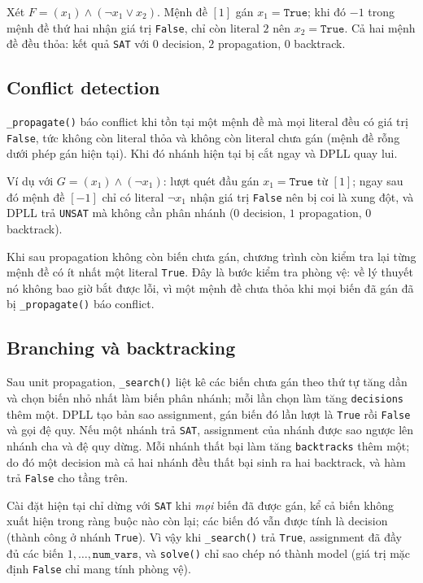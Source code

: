 Xét $F=(x_1)\land(\neg x_1\lor x_2)$. Mệnh đề $[1]$ gán $x_1=\texttt{True}$;
khi đó $-1$ trong mệnh đề thứ hai nhận giá trị \texttt{False}, chỉ còn
literal $2$ nên $x_2=\texttt{True}$. Cả hai mệnh đề đều thỏa: kết quả
\texttt{SAT} với $0$ decision, $2$ propagation, $0$ backtrack.

\subsection{Conflict detection}
\label{sec:dpll-conflict}
\texttt{\_propagate()} báo conflict khi tồn tại một mệnh đề mà mọi literal
đều có giá trị \texttt{False}, tức không còn literal thỏa và không còn
literal chưa gán (mệnh đề rỗng dưới phép gán hiện tại). Khi đó nhánh hiện tại
bị cắt ngay và DPLL quay lui.

Ví dụ với $G=(x_1)\land(\neg x_1)$: lượt quét đầu gán $x_1=\texttt{True}$ từ
$[1]$; ngay sau đó mệnh đề $[-1]$ chỉ có literal $\neg x_1$ nhận giá trị
\texttt{False} nên bị coi là xung đột, và DPLL trả \texttt{UNSAT} mà không
cần phân nhánh ($0$ decision, $1$ propagation, $0$ backtrack).

Khi sau propagation không còn biến chưa gán, chương trình còn kiểm tra lại
từng mệnh đề có ít nhất một literal \texttt{True}. Đây là bước kiểm tra phòng
vệ: về lý thuyết nó không bao giờ bắt được lỗi, vì một mệnh đề chưa thỏa khi
mọi biến đã gán đã bị \texttt{\_propagate()} báo conflict.

\subsection{Branching và backtracking}
Sau unit propagation, \texttt{\_search()} liệt kê các biến chưa gán theo thứ
tự tăng dần và chọn biến nhỏ nhất làm biến phân nhánh; mỗi lần chọn làm tăng
\texttt{decisions} thêm một. DPLL tạo bản sao assignment, gán biến đó lần lượt
là \texttt{True} rồi \texttt{False} và gọi đệ quy. Nếu một nhánh trả
\texttt{SAT}, assignment của nhánh được sao ngược lên nhánh cha và đệ quy dừng.
Mỗi nhánh thất bại làm tăng \texttt{backtracks} thêm một; do đó một decision
mà cả hai nhánh đều thất bại sinh ra hai backtrack, và hàm trả \texttt{False}
cho tầng trên.

Cài đặt hiện tại chỉ dừng với \texttt{SAT} khi \emph{mọi} biến đã được gán,
kể cả biến không xuất hiện trong ràng buộc nào còn lại; các biến đó vẫn được
tính là decision (thành công ở nhánh \texttt{True}). Vì vậy khi
\texttt{\_search()} trả \texttt{True}, assignment đã đầy đủ các biến
$1,\ldots,\texttt{num\_vars}$, và \texttt{solve()} chỉ sao chép nó thành model
(giá trị mặc định \texttt{False} chỉ mang tính phòng vệ).

